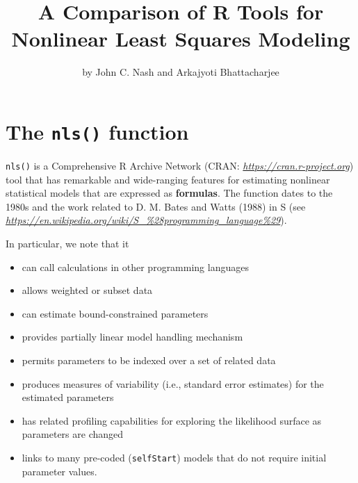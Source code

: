 \title{A Comparison of R Tools for Nonlinear Least Squares Modeling}


\author{by John C. Nash and Arkajyoti Bhattacharjee}

\maketitle


\hypertarget{the-nls-function}{%
\section{\texorpdfstring{The \texttt{nls()} function}{The nls() function}}\label{the-nls-function}}

\texttt{nls()} is a Comprehensive R Archive Network (CRAN: \emph{\url{https://cran.r-project.org}})
tool that has remarkable and wide-ranging features for estimating nonlinear
statistical models that are expressed as \textbf{formulas}.
The function dates to the 1980s and the work related to D. M. Bates and Watts (1988) in S (see
\emph{\url{https://en.wikipedia.org/wiki/S_\%28programming_language\%29}}).

In particular, we
note that it

\begin{itemize}
\tightlist
\item
  can call calculations in other programming languages
\item
  allows weighted or subset data
\item
  can estimate bound-constrained parameters
\item
  provides partially linear model handling mechanism
\item
  permits parameters to be indexed over a set of related data
\item
  produces measures of variability (i.e., standard error estimates) for the
  estimated parameters
\item
  has related profiling capabilities for exploring the likelihood surface as
  parameters are changed
\item
  links to many pre-coded (\texttt{selfStart}) models that do not require
  initial parameter values.
\end{itemize}

